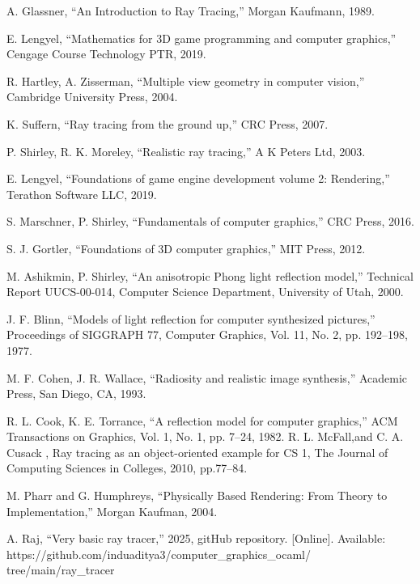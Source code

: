 \documentclass[conference]{IEEEtran}
\begin{document}
\begin{thebibliography}{00}

 A. Glassner, ``An Introduction to Ray Tracing,'' Morgan Kaufmann, 1989.

 E. Lengyel, ``Mathematics for 3D game programming and computer graphics,'' Cengage Course Technology PTR, 2019.

 R. Hartley, A. Zisserman, ``Multiple view geometry in computer vision,'' Cambridge University Press, 2004.

 K. Suffern, ``Ray tracing from the ground up,'' CRC Press, 2007.

 P. Shirley, R. K. Moreley, ``Realistic ray tracing,'' A K Peters Ltd, 2003.

 E. Lengyel, ``Foundations of game engine development volume 2: Rendering,'' Terathon Software LLC, 2019.

 S. Marschner, P. Shirley, ``Fundamentals of computer graphics,'' CRC Press, 2016.

 S. J. Gortler, ``Foundations of 3D computer graphics,'' MIT Press, 2012.

 M. Ashikmin, P. Shirley, ``An anisotropic Phong light reflection model,'' Technical Report UUCS-00-014, Computer Science Department, University of Utah, 2000.

 J. F. Blinn, ``Models of light reflection for computer synthesized pictures,'' Proceedings of SIGGRAPH 77, Computer Graphics, Vol. 11, No. 2, pp. 192–198, 1977.

 M. F. Cohen, J. R. Wallace, ``Radiosity and realistic image synthesis,'' Academic Press, San Diego, CA, 1993.

 R. L. Cook, K. E. Torrance, ``A reflection model for computer graphics,'' ACM Transactions on Graphics, Vol. 1, No. 1, pp. 7–24, 1982.
 R. L. McFall,and C. A. Cusack , Ray tracing as an object-oriented example for CS 1, The Journal of Computing Sciences in Colleges, 2010, pp.77--84.

 M. Pharr and G. Humphreys, ``Physically Based Rendering: From Theory to Implementation,'' Morgan Kaufman, 2004.


 A. Raj, ``Very basic ray tracer,'' 2025, gitHub repository. [Online]. Available: https://github.com/induaditya3/computer\_graphics\_ocaml/\\tree/main/ray\_tracer



\end{thebibliography}
\end{document}
